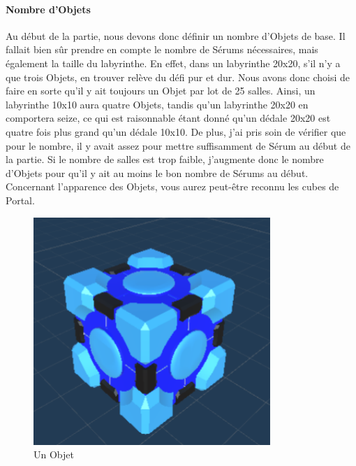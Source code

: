 \documentclass{article}
\begin{document}
\paragraph{Nombre d'Objets}
Au début de la partie, nous devons donc définir un nombre d'Objets de base. Il fallait bien sûr prendre en compte le nombre de Sérums nécessaires, mais également la taille du labyrinthe. En effet, dans un labyrinthe 20x20, s'il n'y a que trois Objets, en trouver relève du défi pur et dur. Nous avons donc choisi de faire en sorte qu'il y ait toujours un Objet par lot de 25 salles. Ainsi, un labyrinthe 10x10 aura quatre Objets, tandis qu'un labyrinthe 20x20 en comportera seize, ce qui est raisonnable étant donné qu'un dédale 20x20 est quatre fois plus grand qu'un dédale 10x10. De plus, j'ai pris soin de vérifier que pour le nombre, il y avait assez pour mettre suffisamment de Sérum au début de la partie. Si le nombre de salles est trop faible, j'augmente donc le nombre d'Objets pour qu'il y ait au moins le bon nombre de Sérums au début. Concernant l'apparence des Objets, vous aurez peut-être reconnu les cubes de Portal.

\begin{figure}[H]
    \centering
    \includegraphics[width=0.8\textwidth]{Objet.png}
    \caption{Un Objet}
    \label{Un Objet}
\end{figure}
\end{document}
